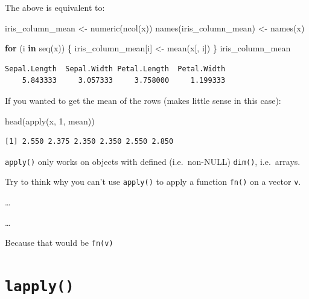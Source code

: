 \documentclass[
]{book}
\newenvironment{Shaded}{\begin{snugshade}}{\end{snugshade}}
\newcommand{\ControlFlowTok}[1]{\textcolor[rgb]{0.13,0.29,0.53}{\textbf{#1}}}
\newcommand{\DecValTok}[1]{\textcolor[rgb]{0.00,0.00,0.81}{#1}}
\newcommand{\FunctionTok}[1]{\textcolor[rgb]{0.00,0.00,0.00}{#1}}
\newcommand{\NormalTok}[1]{#1}
\newcommand{\OtherTok}[1]{\textcolor[rgb]{0.56,0.35,0.01}{#1}}
\begin{document}
The above is equivalent to:

\begin{Shaded}
\begin{Highlighting}[]
\NormalTok{iris\_column\_mean }\OtherTok{\textless{}{-}} \FunctionTok{numeric}\NormalTok{(}\FunctionTok{ncol}\NormalTok{(x))}
\FunctionTok{names}\NormalTok{(iris\_column\_mean) }\OtherTok{\textless{}{-}} \FunctionTok{names}\NormalTok{(x)}

\ControlFlowTok{for}\NormalTok{ (i }\ControlFlowTok{in} \FunctionTok{seq}\NormalTok{(x)) \{}
\NormalTok{  iris\_column\_mean[i] }\OtherTok{\textless{}{-}} \FunctionTok{mean}\NormalTok{(x[, i])}
\NormalTok{\}}
\NormalTok{iris\_column\_mean}
\end{Highlighting}
\end{Shaded}

\begin{verbatim}
Sepal.Length  Sepal.Width Petal.Length  Petal.Width 
    5.843333     3.057333     3.758000     1.199333 
\end{verbatim}

If you wanted to get the mean of the rows (makes little sense in this case):

\begin{Shaded}
\begin{Highlighting}[]
\FunctionTok{head}\NormalTok{(}\FunctionTok{apply}\NormalTok{(x, }\DecValTok{1}\NormalTok{, mean))}
\end{Highlighting}
\end{Shaded}

\begin{verbatim}
[1] 2.550 2.375 2.350 2.350 2.550 2.850
\end{verbatim}

\begin{rmdnote}
\texttt{apply()} only works on objects with defined (i.e.~non-NULL)
\texttt{dim()}, i.e.~arrays.
\end{rmdnote}

\begin{rmdnote}
Try to think why you can't use \texttt{apply()} to apply a function
\texttt{fn()} on a vector \texttt{v}.

\ldots{}

\ldots{}

Because that would be \texttt{fn(v)}
\end{rmdnote}

\hypertarget{lapply}{%
\section{\texorpdfstring{\texttt{lapply()}}{lapply()}}\label{lapply}}
\end{document}

